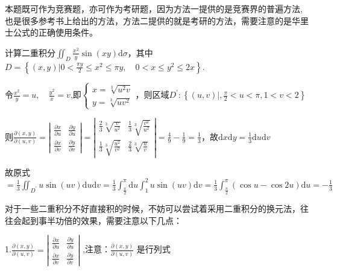 \begin{xiti}
\begin{solution}
		\begin{note}
			本题既可作为竞赛题，亦可作为考研题，因为方法一提供的是竞赛界的普遍方法,也是很多参考书上给出的方法，方法二提供的就是考研的方法，需要注意的是华里士公式的正确使用条件。
		\end{note}
	\end{solution}
	\item 计算二重积分$\iint_{D} \frac{x^{2}}{y} \sin (x y) \mathrm{d} \sigma$，其中$D=\left\{(x, y) | 0<\frac{\pi y}{2} \leqslant x^{2} \leqslant \pi y, \quad 0<x \leqslant y^{2} \leqslant 2 x\right\}$.
	\begin{solution}
		令$\frac{x^{2}}{y}=u, \quad \frac{y^{2}}{x}=v$,即$
		\left\{\begin{array}{l}{x=\sqrt[3]{u^{2} v}} \\ {y=\sqrt[3]{u v^{2}}}\end{array}\right.
		$，则区域$D^{\prime} :\left\{(u, v) |, \frac{\pi}{2}<u<\pi, 1<v<2\right\}$
		
		则$\frac{\partial(x, y)}{\partial(u, v)}=\left| \begin{array}{ll}{\frac{\partial x}{\partial u}} & {\frac{\partial y}{\partial u}} \\ {\frac{\partial x}{\partial v}} & {\frac{\partial y}{\partial v}}\end{array}\right|=\left| \begin{array}{ll}{\frac{2}{3} \sqrt[3]{\frac{v}{u^{2}}}} & {\frac{1}{3} \sqrt[3]{\frac{v^{2}}{u^{2}}}} \\ {\frac{1}{3} \sqrt[3]{\frac{u^{2}}{v^{2}}}} & {\frac{2}{3} \sqrt[3]{\frac{u}{v}}}\end{array}\right|=\frac{4}{9}-\frac{1}{9}=\frac{1}{3}$，故$\mathrm{d} x \mathrm{d} y=\frac{1}{3} \mathrm{d} u \mathrm{d} v$
		
		故原式$=\frac{1}{3} \iint_{D^{\prime}} u \sin (u v) \mathrm{d} u \mathrm{d} v=\frac{1}{3} \int_{\frac{\pi}{2}}^{\pi} \mathrm{d} u \int_{1}^{2} u \sin (u v) \mathrm{d} v=\frac{1}{3} \int_{\frac{\pi}{2}}^{\pi}(\cos u-\cos 2 u) \mathrm{d} u=-\frac{1}{3}$
		
		\begin{note}
			对于一些二重积分不好直接积的时候，不妨可以尝试着采用二重积分的换元法，往往会起到事半功倍的效果，需要注意以下几点：
			
			1.$\frac{\partial(x, y)}{\partial(u, v)}=\left| \begin{array}{ll}{\frac{\partial x}{\partial u}} & {\frac{\partial y}{\partial u}} \\ {\frac{\partial x}{\partial v}} & {\frac{\partial y}{\partial v}}\end{array}\right|$ ,注意：$\frac{\partial(x, y)}{\partial(u, v)}$ 是行列式
			

\end{note}
\end{solution}
\end{xiti}
